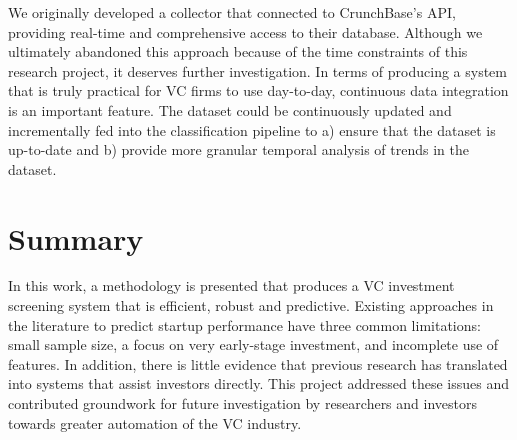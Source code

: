 \documentclass[../thesis/thesis.tex]{subfiles}
\begin{document}
We originally developed a collector that connected to CrunchBase’s API, providing real-time and comprehensive access to their database. Although we ultimately abandoned this approach because of the time constraints of this research project, it deserves further investigation. In terms of producing a system that is truly practical for VC firms to use day-to-day, continuous data integration is an important feature.  The dataset could be continuously updated and incrementally fed into the classification pipeline to a) ensure that the dataset is up-to-date and b) provide more granular temporal analysis of trends in the dataset.

\section{Summary}

In this work, a methodology is presented that produces a VC investment screening system that is efficient, robust and predictive. Existing approaches in the literature to predict startup performance have three common limitations: small sample size, a focus on very early-stage investment, and incomplete use of features. In addition, there is little evidence that previous research has translated into systems that assist investors directly. This project addressed these issues and contributed groundwork for future investigation by researchers and investors towards greater automation of the VC industry.

\end{document}
